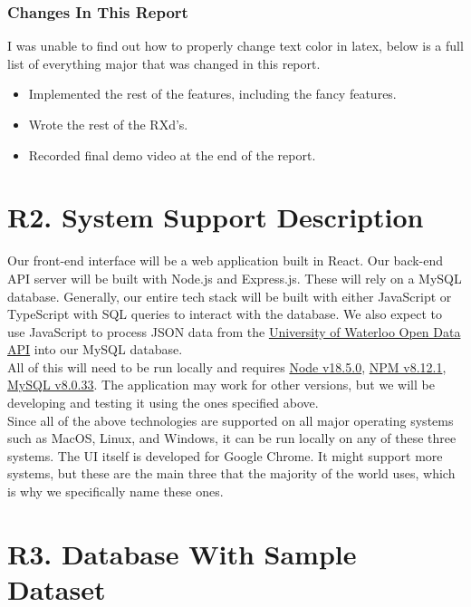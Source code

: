 \documentclass[12pt, a4paper]{article}
\begin{document}
\subsubsection*{Changes In This Report}
I was unable to find out how to properly change text color in latex, below is a full list of everything major that was changed in this report.
\begin{itemize}
    \item Implemented the rest of the features, including the fancy features.
    \item Wrote the rest of the RXd's.
    \item Recorded final demo video at the end of the report.
\end{itemize}
\section*{R2. System Support Description}
\label{sec:R2}

Our front-end interface will be a web application built in React. Our back-end API server will be built with Node.js and Express.js. These will rely on a MySQL database. Generally, our entire tech stack will be built with either JavaScript or TypeScript with SQL queries to interact with the database. We also expect to use JavaScript to process JSON data from the \href{https://openapi.data.uwaterloo.ca/api-docs/index.html}{University of Waterloo Open Data API} into our MySQL database.\\

All of this will need to be run locally and requires \href{https://nodejs.org/en/download}{Node v18.5.0}, \href{https://nodejs.org/en/download}{NPM v8.12.1}, \href{https://dev.mysql.com/downloads/mysql/}{MySQL v8.0.33}. The application may work for other versions, but we will be developing and testing it using the ones specified above.\\

Since all of the above technologies are supported on all major operating systems such as MacOS, Linux, and Windows, it can be run locally on any of these three systems. The UI itself is developed for Google Chrome. It might support more systems, but these are the main three that the majority of the world uses, which is why we specifically name these ones.

\section*{R3. Database With Sample Dataset}
\label{sec:R3}
\end{document}
